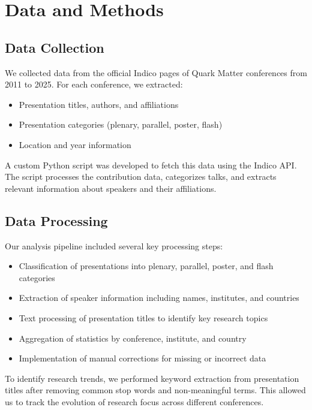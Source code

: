 \documentclass[a4paper,11pt]{article}
\begin{document}
\section{Data and Methods}

\subsection{Data Collection}

We collected data from the official Indico pages of Quark Matter conferences from 2011 to 2025. For each conference, we extracted:
\begin{itemize}
    \item Presentation titles, authors, and affiliations
    \item Presentation categories (plenary, parallel, poster, flash)
    \item Location and year information
\end{itemize}

A custom Python script was developed to fetch this data using the Indico API. The script processes the contribution data, categorizes talks, and extracts relevant information about speakers and their affiliations.

\subsection{Data Processing}

Our analysis pipeline included several key processing steps:
\begin{itemize}
    \item Classification of presentations into plenary, parallel, poster, and flash categories
    \item Extraction of speaker information including names, institutes, and countries
    \item Text processing of presentation titles to identify key research topics
    \item Aggregation of statistics by conference, institute, and country
    \item Implementation of manual corrections for missing or incorrect data
\end{itemize}

To identify research trends, we performed keyword extraction from presentation titles after removing common stop words and non-meaningful terms. This allowed us to track the evolution of research focus across different conferences.
\end{document}
